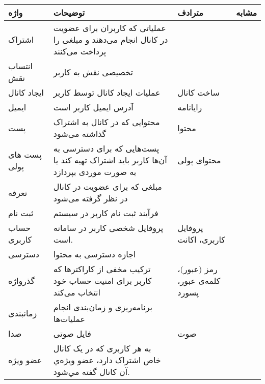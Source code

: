 \begin{table}[H]
    \centering
    \begin{tabular}{|p{4cm}|p{4cm}|p{4cm}|p{4cm}|}
        \hline \textbf{واژه} & \textbf{توضیحات} & \textbf{مترادف} & \textbf{مشابه} \\\hline
 اشتراک & عملیاتی که کاربران برای عضویت در کانال انجام می‌دهند و مبلغی را پرداخت می‌کنند & & \\\hline
 انتساب نقش & تخصیصی نقش به کاربر & & \\\hline
 ایجاد کانال & عملیات ایجاد کانال توسط کاربر & ساخت کانال & \\\hline
 ایمیل & آدرس ایمیل کاربر است & رایانامه & \\\hline
 پست & محتوایی که در کانال به اشتراک گذاشته می‌شود & محتوا & \\\hline
 پست های پولی & پست‌هایی که برای دسترسی به آن‌ها کاربر باید اشتراک تهیه کند یا به صورت موردی بپردازد & محتوای پولی & \\\hline
 تعرفه & مبلغی که برای عضویت در کانال در نظر گرفته می‌شود & & \\\hline
 ثبت نام & فرآیند ثبت نام کاربر در سیستم & & \\\hline
 حساب کاربری & پروفایل شخصی کاربر در سامانه است. & پروفایل کاربری، اکانت & \\\hline
 دسترسی & اجازه دسترسی به محتوا & & \\\hline
 گذرواژه & ترکیب مخفی از کاراکترها که کاربر برای امنیت حساب خود انتخاب می‌کند & رمز (عبور)، کلمه‌ی عبور، پسورد & \\\hline
 زمانبندی & برنامه‌ریزی و زمان‌بندی انجام عملیات‌ها & & \\\hline
 صدا & فایل صوتی & صوت & \\\hline
 عضو ویژه & به هر کاربری که در یک کانال خاص اشتراک دارد، عضو ویژه‌ي آن کانال گفته مي‌شود.& & \\\hline
\end{tabular}
\end{table}
\pagebreak
